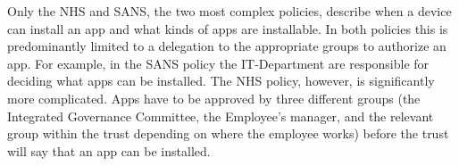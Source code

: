 \documentclass{llncs}
\newenvironment{policyrule}[1]{%
  \begin{mdframed}\footnotesize
      \noindent\textbf{\sffamily #1}:~\itshape%
}{%
  \end{mdframed}
}
\begin{document}
Only the NHS and SANS, the two most complex policies, describe when a device can install an app and what kinds of apps are installable.
In both policies this is predominantly limited to a delegation to the appropriate groups to authorize an app.
For example, in the SANS policy the IT-Department are responsible for deciding what apps can be installed.
The NHS policy, however, is significantly more complicated.
Apps have to be approved by three different groups (the Integrated Governance Committee, the Employee's manager, and the relevant group within the trust depending on where the employee works) before the trust will say that an app can be installed.
\end{document}
